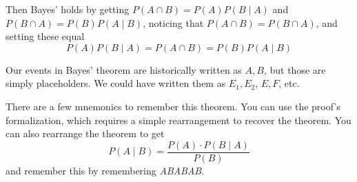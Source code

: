 \documentclass[main.tex]{subfiles}
\begin{document}
Then Bayes' holds by getting \(P(A \cap B) = P(A)P(B \mid A)\) and \(P(B \cap A) = P(B)P(A \mid B)\), noticing that \(P(A \cap B) = P(B \cap A)\), and setting these equal \[P(A)P(B \mid A) = P(A \cap B) = P(B)P(A \mid B)\]

\begin{rem}
	Our events in Bayes' theorem are historically written as \(A,B\), but those are simply placeholders. We could have written them as \(E_1,E_2\), \(E,F\), etc.
\end{rem}

\begin{rem}
	There are a few mnemonics to remember this theorem. You can use the proof's formalization, which requires a simple rearrangement to recover the theorem. You can also rearrange the theorem to get \[P(A \mid B) = \frac{P(A) \cdot P(B \mid A)}{P(B)}\] and remember this by remembering \textit{ABABAB}.
\end{rem}
\end{document}
